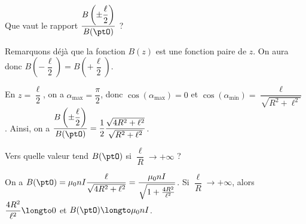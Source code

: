 \begin{enonce}
Que vaut le rapport $\dfrac{B \left(\pm \dfrac{\ell}{2} \right)} {B(\ptO)}$ ?
\end{enonce}


\begin{corrigeNewpage}
Remarquons déjà que la fonction $B(z)$ est une fonction paire de $z$. On aura donc $B \left (- \dfrac{\ell}{2} \right ) = B \left( +\dfrac{\ell}{2} \right)$.

En $z = \dfrac{\ell}{2}$, on a $\alpha_{\text{max}} = \dfrac{\pi}{2}$, donc $\cos(\alpha_{\text{max}}) = 0$ et $\cos(\alpha_{\text{min}}) = \dfrac{\ell}{\sqrt{R^2 + \ell^2}}$.
Ainsi, on a 
$\dfrac{B \left(\pm \dfrac{\ell}{2} \right)} {B(\ptO)} = \dfrac{1}{2} \dfrac{\sqrt{4R^2 + \ell^2}}{\sqrt{R^2 + \ell^2}}$.
\end{corrigeNewpage}




\begin{enonce}
Vers quelle valeur tend $B(\ptO)$ si $\dfrac{\ell}{R} \to +\infty$ ?
\end{enonce}


\begin{corrige}
On a $B(\ptO) = \mu_0 n I \dfrac{\ell}{\sqrt{4R^2+ \ell^2}} = \dfrac{\mu_0 n I}{\sqrt{1+\frac{4R^2}{\ell^2}}}$.
Si $\dfrac{\ell}{R} \to +\infty$, alors $\dfrac{4R^2}{\ell^2} \longto 0$ et $B(\ptO) \longto \mu_0 n I$.
\end{corrige}



\finEntrainement



\newpage







